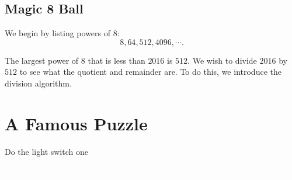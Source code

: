 \clearpage

\subsection*{Magic 8 Ball}

We begin by listing powers of $8$:  $$8, 64, 512, 4096, \cdots.$$  

The largest power of $8$ that is less than $2016$ is $512$. We wish to divide $2016$ by $512$ to see what the quotient and remainder are. To do this, we introduce the division algorithm.

\section{A Famous Puzzle}

Do the light switch one  


\clearpage
\thispagestyle{empty} %
\textcolor{white}{\cite{a:1}, \cite{me:1}}



\clearpage






